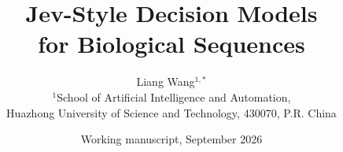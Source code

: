 \documentclass[10pt]{article}
\title{Jev-Style Decision Models\protect\\for Biological Sequences}
\author{Liang Wang$^{1,*}$\\[4pt]
\small $^1$School of Artificial Intelligence and Automation,\\
\small Huazhong University of Science and Technology, 430070, P.R. China}
\date{Working manuscript, September 2026}
\begin{document}
\maketitle
\begin{abstract}

\end{abstract}







\label{main_end}
\clearpage
\begingroup
\small


\endgroup
\clearpage
\appendix

\clearpage

\end{document}
